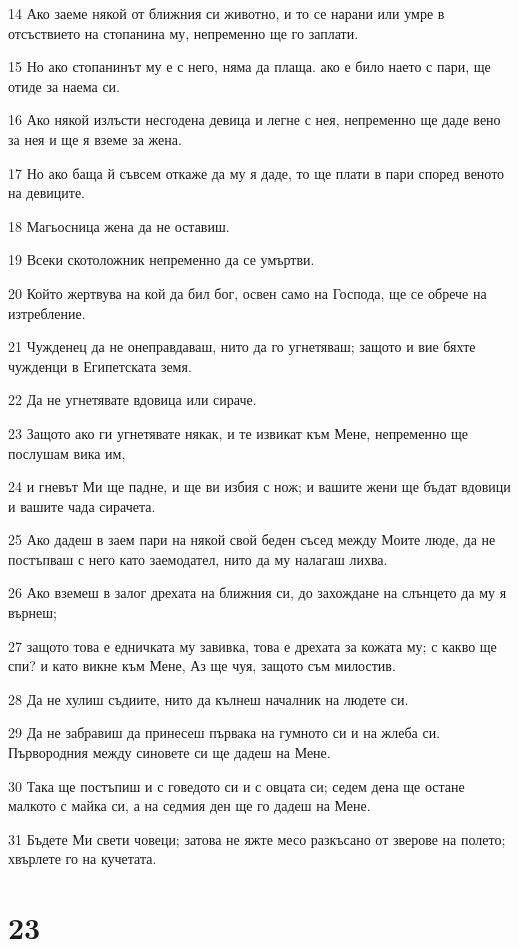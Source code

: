 \par 14 Ако заеме някой от ближния си животно, и то се нарани или умре в отсъствието на стопанина му, непременно ще го заплати.
\par 15 Но ако стопанинът му е с него, няма да плаща. ако е било наето с пари, ще отиде за наема си.
\par 16 Ако някой излъсти несгодена девица и легне с нея, непременно ще даде вено за нея и ще я вземе за жена.
\par 17 Но ако баща й съвсем откаже да му я даде, то ще плати в пари според веното на девиците.
\par 18 Магьосница жена да не оставиш.
\par 19 Всеки скотоложник непременно да се умъртви.
\par 20 Който жертвува на кой да бил бог, освен само на Господа, ще се обрече на изтребление.
\par 21 Чужденец да не онеправдаваш, нито да го угнетяваш; защото и вие бяхте чужденци в Египетската земя.
\par 22 Да не угнетявате вдовица или сираче.
\par 23 Защото ако ги угнетявате някак, и те извикат към Мене, непременно ще послушам вика им,
\par 24 и гневът Ми ще падне, и ще ви избия с нож; и вашите жени ще бъдат вдовици и вашите чада сирачета.
\par 25 Ако дадеш в заем пари на някой свой беден съсед между Моите люде, да не постъпваш с него като заемодател, нито да му налагаш лихва.
\par 26 Ако вземеш в залог дрехата на ближния си, до захождане на слънцето да му я върнеш;
\par 27 защото това е едничката му завивка, това е дрехата за кожата му; с какво ще спи? и като викне към Мене, Аз ще чуя, защото съм милостив.
\par 28 Да не хулиш съдиите, нито да кълнеш началник на людете си.
\par 29 Да не забравиш да принесеш първака на гумното си и на жлеба си. Първородния между синовете си ще дадеш на Мене.
\par 30 Така ще постъпиш и с говедото си и с овцата си; седем дена ще остане малкото с майка си, а на седмия ден ще го дадеш на Мене.
\par 31 Бъдете Ми свети човеци; затова не яжте месо разкъсано от зверове на полето; хвърлете го на кучетата.

\chapter{23}

